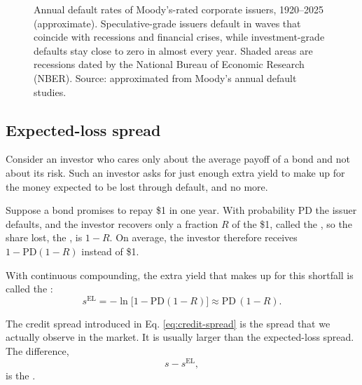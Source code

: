 \begin{figure}[htbp]
{%
}
\caption{Annual default rates of Moody's-rated corporate issuers, 1920--2025 (approximate). Speculative-grade issuers default in waves that coincide with recessions and financial crises, while investment-grade defaults stay close to zero in almost every year. Shaded areas are recessions dated by the National Bureau of Economic Research (NBER). Source: approximated from Moody's annual default studies.}
\label{fig:default-rates-time}
\end{figure}


\subsection{Expected-loss spread}

Consider an investor who cares only about the average payoff of a bond and not about its risk. Such an investor asks for just enough extra yield to make up for the money expected to be lost through default, and no more. 

Suppose a bond promises to repay \$1 in one year. With probability PD the issuer defaults, and the investor recovers only a fraction $R$ of the \$1, called the , so the share lost, the , is $1-R$. On average, the investor therefore receives $1 - \text{PD}(1-R)$ instead of \$1. 


With continuous compounding, the extra yield that makes up for this shortfall is called the :
\begin{equation}
  s^{\text{EL}} = -\ln\bigl[1 - \text{PD}(1-R)\bigr] \approx \text{PD}\,(1-R).
  \label{eq:expected-loss-spread}
\end{equation}

The credit spread introduced in Eq. \ref{eq:credit-spread} is the spread that we actually observe in the market. It is usually larger than the expected-loss spread. The difference,
\begin{equation}
  s - s^{\text{EL}},
  \label{eq:credit-risk-premium}
\end{equation}
is the . 

